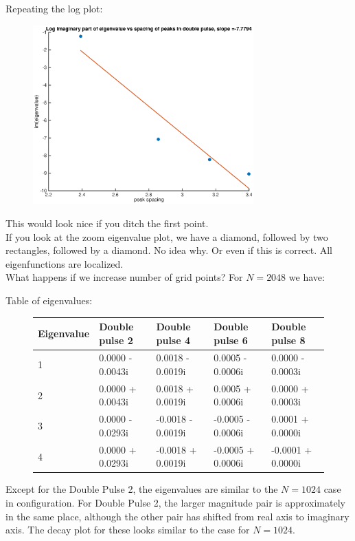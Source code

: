 \documentclass[12pt]{article}
\begin{document}
Repeating the log plot:
\begin{figure}[H]
\includegraphics[width=8.5cm]{logimagspacing2.eps}
\end{figure}
This would look nice if you ditch the first point.\\

If you look at the zoom eigenvalue plot, we have a diamond, followed by two rectangles, followed by a diamond. No idea why. Or even if this is correct. All eigenfunctions are localized.\\

What happens if we increase number of grid points? For $N = 2048$ we have:

Table of eigenvalues:
\begin{figure}[H]
\begin{tabular}{l|llll}
Eigenvalue & Double pulse 2 & Double pulse 4 & Double pulse 6  & Double pulse 8 \\ \hline
1     &    0.0000 - 0.0043i &   0.0018 - 0.0019i &    0.0005 - 0.0006i  &    0.0000 - 0.0003i  \\
2     &    0.0000 + 0.0043i &   0.0018 + 0.0019i &    0.0005 + 0.0006i  &    0.0000 + 0.0003i  \\
3     &    0.0000 - 0.0293i &  -0.0018 - 0.0019i &   -0.0005 - 0.0006i  &    0.0001 + 0.0000i  \\
4     &    0.0000 + 0.0293i &  -0.0018 + 0.0019i &   -0.0005 + 0.0006i  &   -0.0001 + 0.0000i  \\       
\end{tabular}
\end{figure}

Except for the Double Pulse 2, the eigenvalues are similar to the $N = 1024$ case in configuration. For Double Pulse 2, the larger magnitude pair is approximately in the same place, although the other pair has shifted from real axis to imaginary axis. The decay plot for these looks similar to the case for $N = 1024$.
\end{document}
